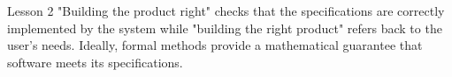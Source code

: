 \documentclass[aspectratio=1610]{beamer}
\begin{document}
\begin{frame}{Lesson 2}{}
\LARGE
"Building the product right" checks that the specifications are correctly implemented by the system while "building the right product" refers back to the user's needs. Ideally, formal methods provide a mathematical guarantee that software meets its specifications.
\end{frame}



\end{document}
